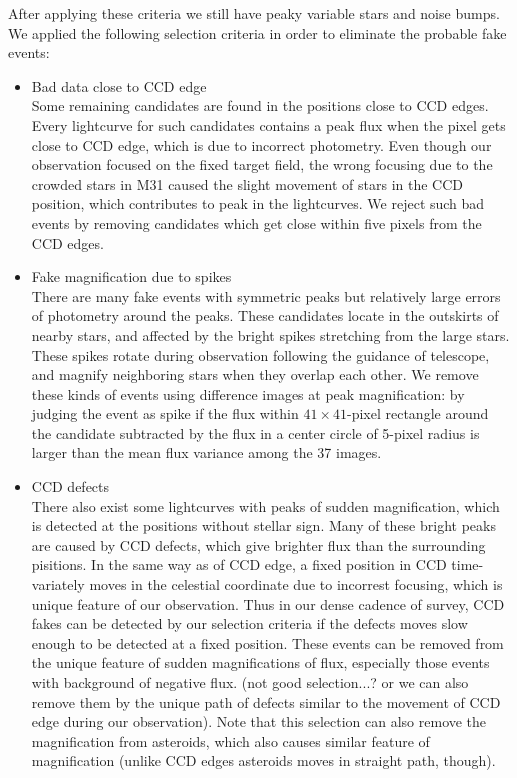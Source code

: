 \documentclass[iop, apj]{emulateapj}
\newcommand{\?}{\stackrel{?}{=}}
\begin{document}
After applying these criteria we still have 
peaky variable stars and noise bumps. 
We applied the following selection criteria 
in order to eliminate the probable fake events: 

\begin{itemize}
\item{Bad data close to CCD edge}\\
Some remaining candidates are found in the positions close to CCD edges. 
Every lightcurve for such candidates contains a peak flux when the 
pixel gets close to CCD edge, which is due to incorrect photometry. 
Even though our observation focused on the fixed target field, 
the wrong focusing due to the crowded stars in M31 caused 
the slight movement of stars in the CCD position,  
which contributes to peak in the lightcurves. 
We reject such bad events by removing candidates which get close 
within five pixels from the CCD edges. 

\item{Fake magnification due to spikes}\\
There are many fake events with symmetric peaks but relatively 
large errors of photometry around the peaks. 
These candidates locate in the outskirts of nearby stars, and 
affected by the bright spikes stretching from the large stars. 
These spikes rotate during observation following the guidance of telescope, 
and magnify neighboring stars when they overlap each other. 
We remove these kinds of events using difference images at peak magnification: 
by judging the event as spike if the flux within $41\times41$-pixel rectangle 
around the candidate subtracted by the flux in a center circle of 5-pixel radius 
is larger than the mean flux variance among the 37 images.  


\item{CCD defects}\\%
There also exist some lightcurves with peaks of sudden magnification, 
which is detected at the positions without stellar sign. 
Many of these bright peaks are caused by CCD defects, which give 
brighter flux than the surrounding pisitions. 
In the same way as of CCD edge, a fixed position in CCD time-variately 
moves in the celestial coordinate due to incorrest focusing, which is 
unique feature of our observation. 
Thus in our dense cadence of survey, CCD fakes can be detected 
by our selection criteria if the defects moves slow enough to 
be detected at a fixed position. 
These events can be removed from the unique feature of sudden magnifications of flux, 
especially those events with background of negative flux. 
(not good selection...? or we can also remove them by 
the unique path of defects similar to the movement of CCD edge during our observation). 
Note that this selection can also remove the magnification from asteroids, which 
also causes similar feature of magnification 
(unlike CCD edges asteroids moves in straight path, though). 

\end{itemize}
\end{document}
